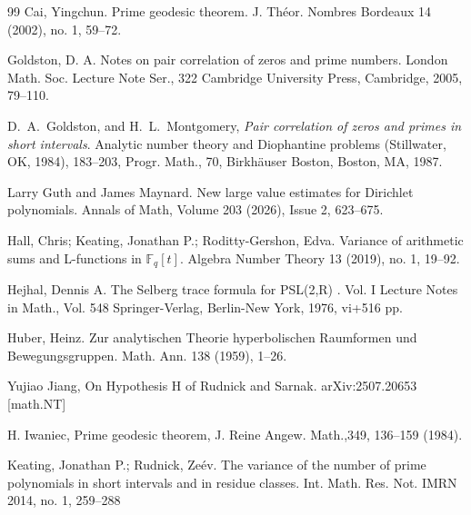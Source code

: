 \documentclass[12pt]{amsart}
\begin{document}
\begin{thebibliography}{99}
Cai, Yingchun. 
Prime geodesic theorem. 
J. Th\'eor. Nombres Bordeaux 14 (2002), no. 1, 59--72.


 Goldston, D. A. 
Notes on pair correlation of zeros and prime numbers. 
London Math. Soc. Lecture Note Ser., 322 
Cambridge University Press, Cambridge, 2005, 79--110.

D.~A.~Goldston, and H.~L.~Montgomery, {\em Pair correlation of zeros
and primes in short intervals}. Analytic number theory and
Diophantine problems (Stillwater, OK, 1984), 183--203, Progr. Math.,
70, Birkh\"auser Boston, Boston, MA, 1987.

  Larry Guth and James Maynard. New large value estimates for Dirichlet polynomials. Annals of Math,  Volume 203 (2026), Issue 2, 623--675. 


Hall, Chris; Keating, Jonathan P.; Roditty-Gershon, Edva. 
 Variance of arithmetic sums and  L-functions in  $\mathbb F_q[t]$.   
Algebra Number Theory 13 (2019), no. 1, 19--92.


Hejhal, Dennis A. 
 The Selberg trace formula for  PSL(2,R) . Vol. I 
Lecture Notes in Math., Vol. 548
Springer-Verlag, Berlin-New York, 1976, vi+516 pp.




Huber, Heinz. 
Zur analytischen Theorie hyperbolischen Raumformen und Bewegungsgruppen. 
Math. Ann. 138 (1959), 1–26.


 Yujiao Jiang, On Hypothesis H of Rudnick and Sarnak. arXiv:2507.20653 [math.NT]

H. Iwaniec, Prime geodesic theorem, J. Reine Angew. Math.,349, 136--159 (1984).


Keating, Jonathan P.; Rudnick, Ze\'ev. 
The variance of the number of prime polynomials in short intervals and in residue classes. 
Int. Math. Res. Not. IMRN 2014, no. 1, 259–288



\end{thebibliography}
\end{document}
